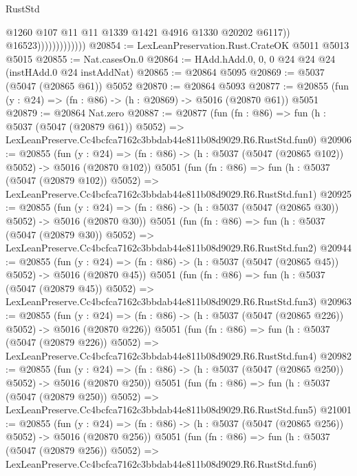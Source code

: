 \begin{lexlean}{RustStd}
\begin{coremodule}
                                  @1260
                                  @107
                                  @11
                                  @11
                                  @1339
                                  @1421
                                  @4916
                                  @1330
                                  @20202
                                  @6117))
                              @16523)))))))))))))
@20854 := LexLeanPreservation.Rust.CrateOK @5011 @5013 @5015
@20855 := Nat.casesOn.{0}
@20864 := HAdd.hAdd.{0, 0, 0} @24 @24 @24 (instHAdd.{0} @24 instAddNat)
@20865 := @20864 @5095
@20869 := @5037 (@5047 (@20865 @61)) @5052
@20870 := @20864 @5093
@20877 := @20855 (fun (y : @24) => (fn : @86) -> (h : @20869) -> @5016 (@20870 @61)) @5051
@20879 := @20864 Nat.zero
@20887 := @20877
    (fun (fn : @86) =>
    fun (h : @5037 (@5047 (@20879 @61)) @5052) =>
    LexLeanPreserve.Cc4bcfca7162c3bbdab44e811b08d9029.R6.RustStd.fun0)
@20906 := @20855
    (fun (y : @24) => (fn : @86) -> (h : @5037 (@5047 (@20865 @102)) @5052) -> @5016 (@20870 @102))
    @5051
    (fun (fn : @86) =>
    fun (h : @5037 (@5047 (@20879 @102)) @5052) =>
    LexLeanPreserve.Cc4bcfca7162c3bbdab44e811b08d9029.R6.RustStd.fun1)
@20925 := @20855
    (fun (y : @24) => (fn : @86) -> (h : @5037 (@5047 (@20865 @30)) @5052) -> @5016 (@20870 @30))
    @5051
    (fun (fn : @86) =>
    fun (h : @5037 (@5047 (@20879 @30)) @5052) =>
    LexLeanPreserve.Cc4bcfca7162c3bbdab44e811b08d9029.R6.RustStd.fun2)
@20944 := @20855
    (fun (y : @24) => (fn : @86) -> (h : @5037 (@5047 (@20865 @45)) @5052) -> @5016 (@20870 @45))
    @5051
    (fun (fn : @86) =>
    fun (h : @5037 (@5047 (@20879 @45)) @5052) =>
    LexLeanPreserve.Cc4bcfca7162c3bbdab44e811b08d9029.R6.RustStd.fun3)
@20963 := @20855
    (fun (y : @24) => (fn : @86) -> (h : @5037 (@5047 (@20865 @226)) @5052) -> @5016 (@20870 @226))
    @5051
    (fun (fn : @86) =>
    fun (h : @5037 (@5047 (@20879 @226)) @5052) =>
    LexLeanPreserve.Cc4bcfca7162c3bbdab44e811b08d9029.R6.RustStd.fun4)
@20982 := @20855
    (fun (y : @24) => (fn : @86) -> (h : @5037 (@5047 (@20865 @250)) @5052) -> @5016 (@20870 @250))
    @5051
    (fun (fn : @86) =>
    fun (h : @5037 (@5047 (@20879 @250)) @5052) =>
    LexLeanPreserve.Cc4bcfca7162c3bbdab44e811b08d9029.R6.RustStd.fun5)
@21001 := @20855
    (fun (y : @24) => (fn : @86) -> (h : @5037 (@5047 (@20865 @256)) @5052) -> @5016 (@20870 @256))
    @5051
    (fun (fn : @86) =>
    fun (h : @5037 (@5047 (@20879 @256)) @5052) =>
    LexLeanPreserve.Cc4bcfca7162c3bbdab44e811b08d9029.R6.RustStd.fun6)

\end{coremodule}
\end{lexlean}
